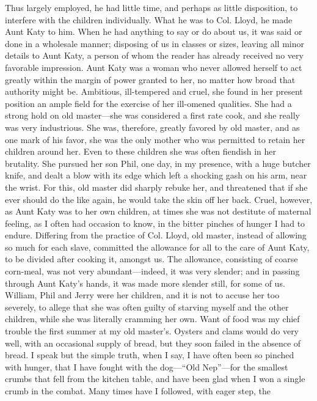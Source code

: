 Thus largely employed, he had little time, and perhaps as little
disposition, to interfere with the children individually. What he was to
Col. Lloyd, he made Aunt Katy to him. When he had anything to say or do
about us, it was said or done in a wholesale manner; disposing of us in
classes or sizes, leaving all minor details to Aunt Katy, a person of
whom the reader has already received no very favorable impression. Aunt
Katy was a woman who never allowed herself to act greatly within the
margin of power granted to her, no matter how broad that authority might
be. Ambitious, ill-tempered and cruel, she found in her present position
an ample field for the exercise of her ill-omened qualities. She had a
strong hold on old master---she was considered a first rate cook, and
she really was very industrious. She was, therefore, greatly favored by
old master, and as one mark of his favor, she was the only mother who
was permitted to retain her children around her. Even to these children
she was often fiendish in her {}brutality. She pursued her son Phil, one
day, in my presence, with a huge butcher knife, and dealt a blow with
its edge which left a shocking gash on his arm, near the wrist. For
this, old master did sharply rebuke her, and threatened that if she ever
should do the like again, he would take the skin off her back. Cruel,
however, as Aunt Katy was to her own children, at times she was not
destitute of maternal feeling, as I often had occasion to know, in the
bitter pinches of hunger I had to endure. Differing from the practice of
Col. Lloyd, old master, instead of allowing so much for each slave,
committed the allowance for all to the care of Aunt Katy, to be divided
after cooking it, amongst us. The allowance, consisting of coarse
corn-meal, was not very abundant---indeed, it was very slender; and in
passing through Aunt Katy's hands, it was made more slender still, for
some of us. William, Phil and Jerry were her children, and it is not to
accuse her too severely, to allege that she was often guilty of starving
myself and the other children, while she was literally cramming her own.
Want of food was my chief trouble the first summer at my old master's.
Oysters and clams would do very well, with an occasional supply of
bread, but they soon failed in the absence of bread. I speak but the
simple truth, when I say, I have often been so pinched with hunger, that
I have fought with the dog---``Old Nep''---for the smallest crumbs that
fell from the kitchen table, and have been glad when I won a single
crumb in the combat. Many times have I followed, with eager step, the
